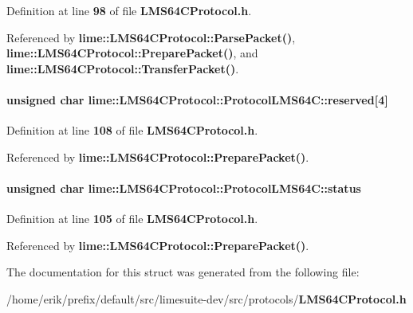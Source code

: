 Definition at line {\bf 98} of file {\bf L\+M\+S64\+C\+Protocol.\+h}.



Referenced by {\bf lime\+::\+L\+M\+S64\+C\+Protocol\+::\+Parse\+Packet()}, {\bf lime\+::\+L\+M\+S64\+C\+Protocol\+::\+Prepare\+Packet()}, and {\bf lime\+::\+L\+M\+S64\+C\+Protocol\+::\+Transfer\+Packet()}.

\paragraph[{reserved}]{\setlength{\rightskip}{0pt plus 5cm}unsigned char lime\+::\+L\+M\+S64\+C\+Protocol\+::\+Protocol\+L\+M\+S64\+C\+::reserved[4]}\label{structlime_1_1LMS64CProtocol_1_1ProtocolLMS64C_a3d358dfee65ec72afbae37d8b9590216}


Definition at line {\bf 108} of file {\bf L\+M\+S64\+C\+Protocol.\+h}.



Referenced by {\bf lime\+::\+L\+M\+S64\+C\+Protocol\+::\+Prepare\+Packet()}.

\paragraph[{status}]{\setlength{\rightskip}{0pt plus 5cm}unsigned char lime\+::\+L\+M\+S64\+C\+Protocol\+::\+Protocol\+L\+M\+S64\+C\+::status}\label{structlime_1_1LMS64CProtocol_1_1ProtocolLMS64C_acd43b17f248e1064460d8737b0859328}


Definition at line {\bf 105} of file {\bf L\+M\+S64\+C\+Protocol.\+h}.



Referenced by {\bf lime\+::\+L\+M\+S64\+C\+Protocol\+::\+Prepare\+Packet()}.



The documentation for this struct was generated from the following file\+:\begin{DoxyCompactItemize}
\item 
/home/erik/prefix/default/src/limesuite-\/dev/src/protocols/{\bf L\+M\+S64\+C\+Protocol.\+h}\end{DoxyCompactItemize}
